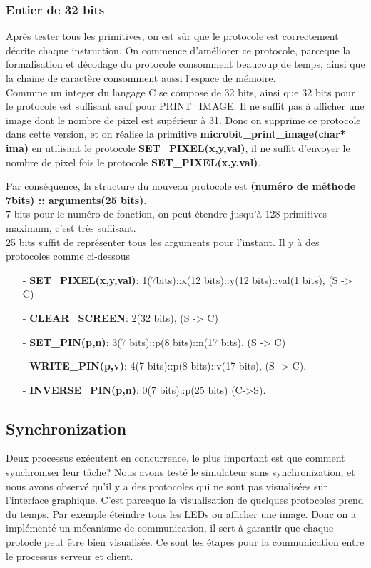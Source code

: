 \documentclass[14px]{article}
\begin{document}
\subsubsection{Entier de 32 bits}
Après tester tous les primitives, on est sûr que le protocole est correctement décrite chaque instruction. On commence d'améliorer ce protocole, parceque la formalisation et décodage du protocole consomment beaucoup de temps, ainsi que la chaine de caractère consomment aussi l'espace de mémoire.\\
Commme un integer du langage C se compose de 32 bits, ainsi que 32 bits pour le protocole est suffisant sauf pour PRINT\_IMAGE. Il ne suffit pas à afficher une image dont le nombre de pixel est supérieur à 31. Donc on supprime ce protocole dans cette version, et on réalise la primitive \textbf{microbit\_print\_image(char* ima)} en utilisant le protocole \textbf{SET\_PIXEL(x,y,val)}, il ne suffit d'envoyer le nombre de pixel fois le protocole \textbf{SET\_PIXEL(x,y,val)}.

Par conséquence, la structure du nouveau protocole est \textbf{(numéro de méthode 7bits) :: arguments(25 bits)}.\\
7 bits pour le numéro de fonction, on peut étendre jusqu'à 128 primitives maximum, c'est très suffisant. \\ 25 bits suffit de représenter tous les arguments pour l'instant.
Il y à des protocoles comme ci-dessous
\begin{enumerate}
	\item[-] \textbf{SET\_PIXEL(x,y,val)}: 1(7bits)::x(12 bits)::y(12 bits)::val(1 bits), (S -> C)
	\item[-] \textbf{CLEAR\_SCREEN}: 2(32 bits), (S -> C)
	\item[-] \textbf{SET\_PIN(p,n)}: 3(7 bits)::p(8 bits)::n(17 bits), (S -> C)
	\item[-] \textbf{WRITE\_PIN(p,v)}: 4(7 bits)::p(8 bits)::v(17 bits), (S -> C).\\

	\item[-] \textbf{INVERSE\_PIN(p,n)}: 0(7 bits)::p(25 bits) (C->S).
\end{enumerate}


\subsection{Synchronization}
Deux processus exécutent en concurrence, le plus important est que comment synchroniser leur tâche? Nous avons testé le simulateur sans synchronization, et nous avons observé qu'il y a des protocoles qui ne sont pas visualisées sur l'interface graphique. C'est parceque la visualisation de quelques protocoles prend du temps. Par exemple éteindre tous les LEDs ou afficher une image. Donc on a implémenté un mécanisme de communication, il sert à garantir que chaque protocle peut être bien visualisée. Ce sont les étapes pour la communication entre le processus serveur et client.
\end{document}
